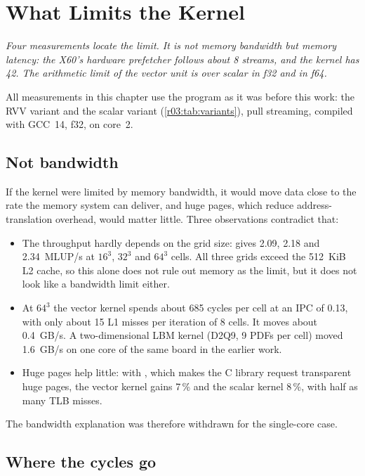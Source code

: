 \chapter{What Limits the Kernel}\label{r03:ch:root-cause}

\emph{Four measurements locate the limit. It is not memory bandwidth but memory latency: the
X60's hardware prefetcher follows about 8 streams, and the kernel has 42. The arithmetic limit
of the vector unit is  over scalar in f32 and  in f64.}

All measurements in this chapter use the program as it was before this work: the RVV
variant  and the scalar variant  (\cref{r03:tab:variants}),
pull streaming, compiled with GCC~14, f32, on core~2.

\section{Not bandwidth}\label{r03:sec:bw}

If the kernel were limited by memory bandwidth, it would move data close to the rate the
memory system can deliver, and huge pages, which reduce address-translation overhead, would
matter little. Three observations contradict that:
\begin{itemize}
  \item The throughput hardly depends on the grid size:  gives 2.09, 2.18
        and 2.34~MLUP/s at $16^3$, $32^3$ and $64^3$ cells. All three grids exceed the
        512~KiB L2 cache, so this alone does not rule out memory as the limit, but it does
        not look like a bandwidth limit either.
  \item At $64^3$ the vector kernel spends about 685 cycles per cell at an IPC of 0.13, with
        only about 15 L1 misses per iteration of 8 cells. It moves about 0.4~GB/s. A
        two-dimensional LBM kernel (D2Q9, 9 PDFs per cell) moved 1.6~GB/s on one core of the
        same board in the earlier work.
  \item Huge pages help little: with , which
        makes the C library request transparent huge pages, the vector kernel gains 7\,\% and
        the scalar kernel 8\,\%, with half as many TLB misses.
\end{itemize}
The bandwidth explanation was therefore withdrawn for the single-core case.

\section{Where the cycles go}\label{r03:sec:cycles}

